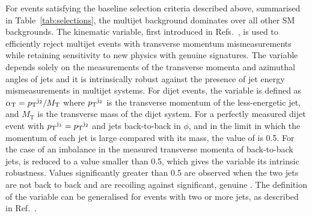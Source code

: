 
For events satisfying the baseline selection criteria described above,
summarised in Table~\ref{tab:selections}, the multijet background
dominates over all other SM backgrounds. The \alphat kinematic
variable, first introduced in Refs.~\cite{Randall:2008rw, RA1Paper},
is used to efficiently reject multijet events with transverse momentum 
mismeasurements while retaining sensitivity to new physics with
genuine \ptvecmiss signatures. The variable \alphat depends solely on the
measurements of the transverse momenta and azimuthal angles of jets
and it is intrinsically robust against the presence of jet energy
mismeasurements in multijet systems. For dijet events, the \alphat
variable is defined as $\alpha_{\text{T}} = {p_{\text T}}^{\rm j_2}/M_\text{T}$ where
${p_{\text T}}^{\rm j_2}$ is the transverse momentum of the less-energetic jet,
and $M_\text{T}$ is the transverse mass of the dijet system.  For a
perfectly measured dijet event with ${p_{\text T}}^{\mathrm{j}_1} =
{p_{\text T}}^{\mathrm{j}_2}$ and jets back-to-back in $\phi$, and in the limit
in which the momentum of each jet is large compared with its mass, the
value of \alphat is 0.5. For the case of an imbalance in the measured
transverse momenta of back-to-back jets, \alphat is reduced to a
value smaller than 0.5, which gives the variable its intrinsic
robustness. Values significantly greater than 0.5 are observed when
the two jets are not back to back and are recoiling against
significant, genuine \ptvecmiss. The definition of the \alphat variable
can be generalised for events with two or more jets, as described in
Ref.~\cite{RA1Paper2012}.

